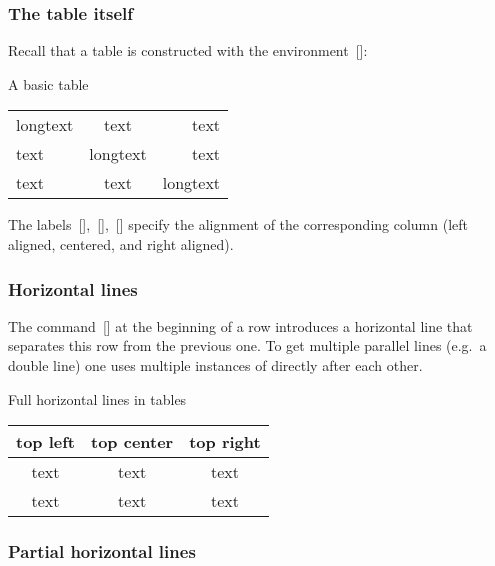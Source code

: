 \subsubsection{The table itself}

Recall that a table is constructed with the environment~[\envname]:

\begin{showlatex}{A basic table}
\begin{tabular}{lcr}
  longtext & text     & text      \\
  text     & longtext & text      \\
  text     & text     & longtext
\end{tabular}
\end{showlatex}
The labels~[\optname],~[\optname],~[\optname] specify the alignment of the corresponding column (left aligned, centered, and right aligned).

\subsubsection{Horizontal lines}

The command~[\comname] at the beginning of a row introduces a horizontal line that separates this row from the previous one.
To get multiple parallel lines (e.g.\ a double line) one uses multiple instances of  directly after each other.
\begin{showlatex}{Full horizontal lines in tables}
\begin{center}
\begin{tabular}{ccc}
  top left & top center & top right \\
  \hline\hline
  text     & text       & text      \\
  \hline
  text     & text       & text
\end{tabular}
\end{center}
\end{showlatex}

\subsubsection{Partial horizontal lines}

